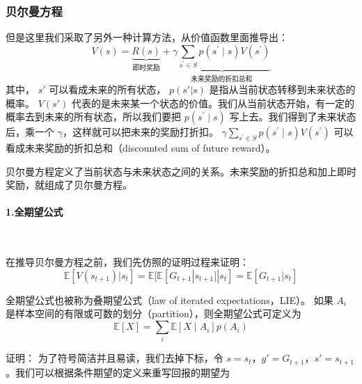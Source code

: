 \subsubsection{贝尔曼方程}

但是这里我们采取了另外一种计算方法，从价值函数里面推导出：
\begin{equation}
  V(s)=\underbrace{R(s)}_{\text {即时奖励}}+\underbrace{\gamma \sum_{s^{\prime} \in S} p\left(s^{\prime} \mid s\right) V\left(s^{\prime}\right)}_{\text {未来奖励的折扣总和}}
  \label{eq:}
\end{equation}
其中，
$s'$ 可以看成未来的所有状态，
$p(s'|s)$  是指从当前状态转移到未来状态的概率。
$V(s')$ 代表的是未来某一个状态的价值。我们从当前状态开始，有一定的概率去到未来的所有状态，所以我们要把 $p\left(s^{\prime} \mid s\right)$ 写上去。我们得到了未来状态后，乘一个 $\gamma$，这样就可以把未来的奖励打折扣。
$\gamma \sum_{s^{\prime} \in S} p\left(s^{\prime} \mid s\right) V\left(s^{\prime}\right)$ 可以看成未来奖励的折扣总和（discounted sum of future reward）。

贝尔曼方程定义了当前状态与未来状态之间的关系。未来奖励的折扣总和加上即时奖励，就组成了贝尔曼方程。

\paragraph{1.全期望公式}~{}
\newline

在推导贝尔曼方程之前，我们先仿照的证明过程来证明：
\begin{equation}
  \mathbb{E}[V(s_{t+1})|s_t]=\mathbb{E}[\mathbb{E}[G_{t+1}|s_{t+1}]|s_t]=\mathbb{E}[G_{t+1}|s_t]
  \label{eq:}
\end{equation}


\begin{tcolorbox}[colframe=blue!25,colback=blue!10]
全期望公式也被称为叠期望公式（law of iterated expectations，LIE）。
如果 $A_i$ 是样本空间的有限或可数的划分（partition），则全期望公式可定义为
\begin{equation}\nonumber
  \mathbb{E}[X]=\sum_{i} \mathbb{E}\left[X \mid A_{i}\right] p\left(A_{i}\right)
  \label{eq:}
\end{equation}
\end{tcolorbox}

证明：
为了符号简洁并且易读，我们去掉下标，令 $s=s_t$，$g'=G_{t+1}$，$s'=s_{t+1}$。我们可以根据条件期望的定义来重写回报的期望为


